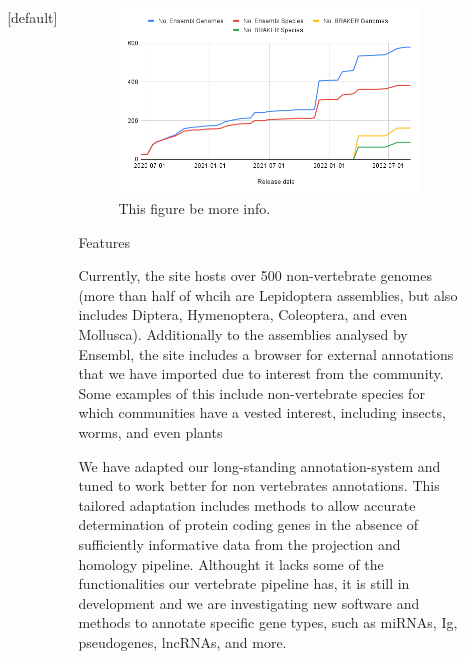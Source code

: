 \documentclass[final]{beamer}
\newlength{\sepwidth}
\newlength{\colwidth}
\newcommand{\separatorcolumn}{\begin{column}{\sepwidth}\end{column}}
\begin{document}
\begin{frame}[t]
\begin{columns}[t]
\begin{column}{\colwidth}
\begin{figure}
\begin{tikzpicture}[align=center,rounded corners]
    \end{tikzpicture}
\end{figure}


\end{column}

\separatorcolumn
{}[default]

\begin{column}{\colwidth}

\begin{figure}
  \centering
  \includegraphics[width=0.9\columnwidth]{chart.png}
  \renewcommand{\thefigure}{2}
  \caption{This figure be more info.}
  \label{tree}
\end{figure}

\begin{block}{Features}

Currently, the site hosts over 500 non-vertebrate genomes (more than half of whcih are Lepidoptera assemblies, but also includes Diptera, Hymenoptera, Coleoptera, and even Mollusca).
Additionally to the assemblies analysed by Ensembl, the site includes a browser for external annotations that we have imported due to interest from the community.
Some examples of this include non-vertebrate species for which communities have a vested interest, including insects, worms, and even plants

We have adapted our long-standing annotation-system and tuned to work better for non vertebrates annotations.
This tailored adaptation includes methods to allow accurate determination of protein coding genes in the absence of sufficiently informative data from the projection and homology pipeline.
Althought it lacks some of the functionalities our vertebrate pipeline has, it is still in development and we are investigating new software and methods to annotate specific gene types, such as miRNAs, Ig, pseudogenes, lncRNAs, and more.


\end{block}
\end{column}
\end{columns}
\end{frame}
\end{document}
